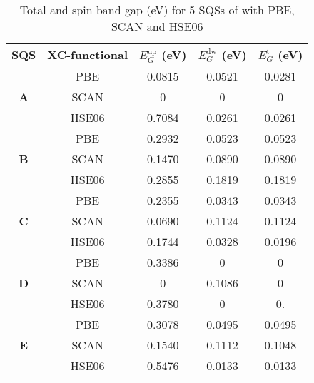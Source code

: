 \begin{table}[H]
\centering
\begin{tabular}{@{}ccccc@{}}
\toprule
SQS & XC-functional  & $E_G ^\text{up}$ (eV) & $E_G ^\text{dw}$ (eV) & $E_G ^\text{t}$ (eV) \\ \midrule
\multicolumn{1}{c|}{\multirow{3}{*}{\textbf{A}}}     & PBE & 0.0815                & 0.0521                  & 0.0281              \\
\multicolumn{1}{c|}{}                                & SCAN & 0                 & 0                  & 0           \\
\multicolumn{1}{c|}{}                                & HSE06 & 0.7084                & 0.0261                  & 0.0261                   \\ \midrule
\multicolumn{1}{c|}{\multirow{3}{*}{\textbf{B}}}     & PBE &  0.2932                & 0.0523                  & 0.0523              \\
\multicolumn{1}{c|}{}                                & SCAN & 0.1470                & 0.0890                  & 0.0890                  \\
\multicolumn{1}{c|}{}                                & HSE06 & 0.2855                & 0.1819                  & 0.1819                        \\ \midrule
\multicolumn{1}{c|}{\multirow{3}{*}{\textbf{C}}}     & PBE & 0.2355                & 0.0343                  & 0.0343              \\
\multicolumn{1}{c|}{}                                & SCAN & 0.0690                & 0.1124                  & 0.1124                   \\
\multicolumn{1}{c|}{}                                & HSE06 & 0.1744                & 0.0328                  & 0.0196                   \\ \midrule
\multicolumn{1}{c|}{\multirow{3}{*}{\textbf{D}}}     & PBE & 0.3386                & 0                       & 0                   \\
\multicolumn{1}{c|}{}                                & SCAN & 0                & 0.1086                  & 0                   \\
\multicolumn{1}{c|}{}                                & HSE06 & 0.3780                & 0                  & 0.          \\ \midrule
\multicolumn{1}{c|}{\multirow{3}{*}{\textbf{E}}}     & PBE & 0.3078                & 0.0495                  & 0.0495              \\
\multicolumn{1}{c|}{}                                & SCAN & 0.1540                & 0.1112                  & 0.1048                      \\
\multicolumn{1}{c|}{}                                & HSE06 & 0.5476                & 0.0133                  & 0.0133                   \\ \bottomrule
\end{tabular}
\caption{Total and spin band gap (eV) for 5 SQSs of  with PBE, SCAN and HSE06}
\end{table}


